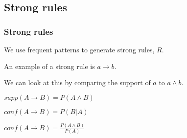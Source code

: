 
\subsection{Strong rules}

\subsubsection{Strong rules}

We use frequent patterns to generate strong rules, \(R\).

An example of a strong rule is \(a\rightarrow b\).

We can look at this by comparing the support of \(a\) to \(a\land b\).

\(supp(A\rightarrow B)=P(A\land B)\)

\(conf(A\rightarrow B)=P(B|A)\)

\(conf(A\rightarrow B)=\frac{P(A\land B)}{P(A)}\)

